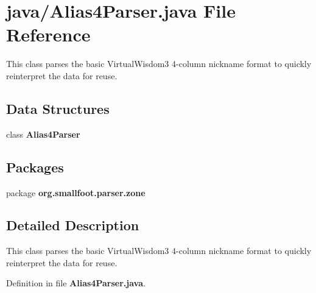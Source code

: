 \section{java/\+Alias4\+Parser.java File Reference}
\label{Alias4Parser_8java}


This class parses the basic Virtual\+Wisdom3 4-\/column nickname format to quickly reinterpret the data for reuse.  


\subsection*{Data Structures}
\begin{DoxyCompactItemize}
\item 
class {\bf Alias4\+Parser}
\end{DoxyCompactItemize}
\subsection*{Packages}
\begin{DoxyCompactItemize}
\item 
package {\bf org.\+smallfoot.\+parser.\+zone}
\end{DoxyCompactItemize}


\subsection{Detailed Description}
This class parses the basic Virtual\+Wisdom3 4-\/column nickname format to quickly reinterpret the data for reuse. 



Definition in file {\bf Alias4\+Parser.\+java}.

